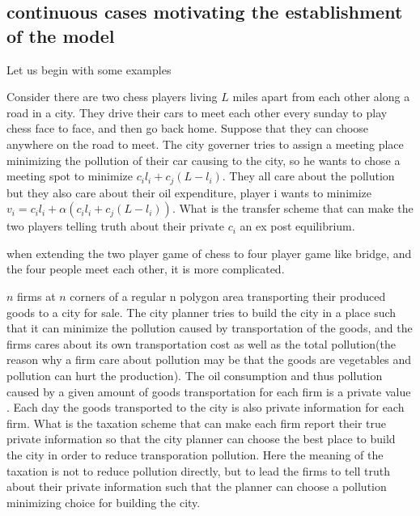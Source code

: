 \begin{prop}
\section{continuous cases motivating the establishment of the model}
Let us begin with some examples
\begin{example}
 Consider there are two chess players living $L$ miles apart from each other along a road in a city. They drive their cars to meet
 each other every sunday to play chess face to face, and then go back home. Suppose that they can choose anywhere on the road to meet.
The city governer tries to assign a meeting place minimizing the pollution of their car causing to the city, so he wants to
chose a meeting spot to minimize $c_il_i+c_j(L-l_i)$. They all care about the 
 pollution but they also care about their oil expenditure, player i wants to minimize $v_i= c_il_i+ \alpha(c_il_i+c_j(L-l_i))$. What
 is the transfer scheme that can make the two players telling truth about their private $c_i$ an ex post equilibrium.
\end{example}
when extending the two player game of chess to four player game like bridge, and the four people meet each other,
it is more complicated. 
\begin{example}
 $n$ firms at $n$ corners of a regular n polygon area transporting their produced goods to a city for sale.
The city planner tries to build the city in a place such that it can minimize the pollution caused by transportation of the goods, 
and the firms cares about its own transportation cost as well as the total pollution(the reason why a firm care about pollution
may be that the goods are vegetables and pollution can hurt the production). The oil consumption and thus pollution caused 
by a given amount of goods transportation for each firm is a private value . Each day the goods transported to the city is also
private information for each firm. What is the taxation scheme that can make each firm report their true private information so that the city 
planner can choose the best place to build the city in order to reduce transporation pollution. Here the meaning of the taxation is not
to reduce pollution directly, but to lead the firms to tell truth about their private information such that the planner can choose a
pollution minimizing choice for building the city.
\end{example}


\end{prop}
